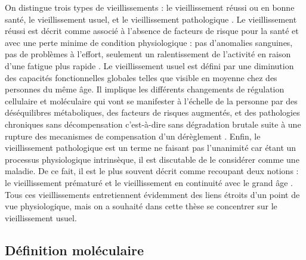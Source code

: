 On distingue trois types de vieillissements : le vieillissement réussi ou en bonne santé, le vieillissement usuel, et le vieillissement pathologique \cite{vanBuchem2004Dec}. Le vieillissement réussi est décrit comme associé à l'absence de facteurs de risque pour la santé et avec une perte minime de condition physiologique : pas d'anomalies sanguines, pas de problèmes à l'effort, seulement un ralentissement de l'activité en raison d'une fatigue plus rapide \cite{Berrut2013}. Le vieillissement usuel est défini par une diminution des capacités fonctionnelles globales telles que visible en moyenne chez des personnes du même âge. Il implique les différents changements de régulation cellulaire et moléculaire qui vont se manifester à l'échelle de la personne par des déséquilibres métaboliques, des facteurs de risques augmentés, et des pathologies chroniques sans décompensation c’est-à-dire sans dégradation brutale suite à une rupture des \glspl{mecanisme} de compensation d'un dérèglement \cite{Berrut2013}. Enfin, le vieillissement pathologique est un terme ne faisant pas l'unanimité car étant un processus physiologique intrinsèque, il est discutable de le considérer comme une maladie. De ce fait, il est le plus souvent décrit comme recoupant deux notions : le vieillissement prématuré et le vieillissement en continuité avec le grand âge \cite{Belmin2014}. Tous ces vieillissements entretiennent évidemment des liens étroits d'un point de vue physiologique, mais on a souhaité dans cette thèse se concentrer sur le vieillissement usuel.


\subsection{Définition moléculaire}


